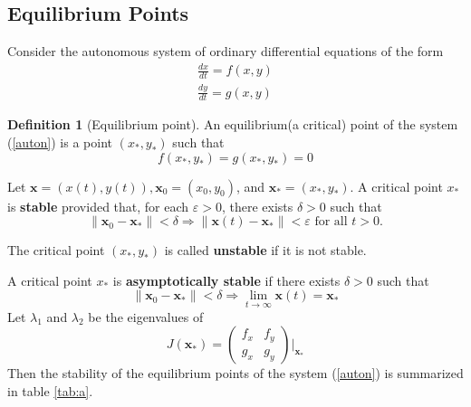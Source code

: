 \documentclass[leqno,DIV=calc,paper=a4,fontsize=11pt]{article}
\theoremstyle{definition}
\newtheorem{defn}[thm]{Definition}
\theoremstyle{plain}
\theoremstyle{remark}
\begin{document}
\subsection{Equilibrium Points}
Consider the autonomous system of ordinary differential equations of the form
\begin{equation}\label{auton}
\begin{aligned}
\frac{dx}{dt}=f(x, y)\\
\frac{dy}{dt}=g(x, y)
\end{aligned}
\end{equation}
\begin{defn}[Equilibrium point]
An equilibrium(a critical) point of the system (\ref{auton}) is a point $(x_*,y_*)$ such that
\[
f(x_*,y_*) = g(x_*,y_*) = 0
\]
\end{defn}
Let $\textbf{x} = (x(t),y(t)),\textbf{x}_0 = (x_0,y_0)$, and $\textbf{x}_* = (x_*,y_*)$.
A critical point $x_*$ is \textbf{stable} provided that, for each $\varepsilon> 0$, there exists $\delta>0$ such that
\[
\|\textbf{x}_0-\textbf{x}_*\| < \delta\Rightarrow \|\textbf{x}(t)-\textbf{x}_*\| <\varepsilon \mbox{ for all } t > 0.
\]

The critical point $(x_*,y_*)$ is called \textbf{unstable} if it is not stable.

A critical point $x_*$ is  \textbf{asymptotically stable} if there exists $\delta>0$ such that
\[
\|\textbf{x}_0-\textbf{x}_*\| < \delta\Rightarrow \lim_{t\to\infty}\textbf{x}(t)=\textbf{x}_*
\]
Let $\lambda_1$ and $\lambda_2$ be the eigenvalues of
\[
J(\textbf{x}_*)=
\begin{pmatrix}
  f_x & f_y \\
  g_x & g_y
\end{pmatrix}\biggl|_{\textbf{x}_*}
\]
Then the stability of the equilibrium points of the system (\ref{auton}) is summarized in table \ref{tab:a}.
\end{document}
